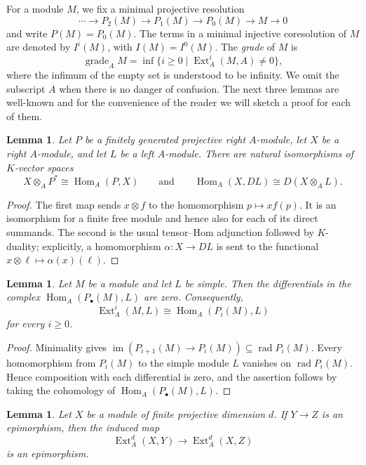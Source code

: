 \documentclass[a4paper]{amsart}
\newtheorem{lemma}[theorem]{Lemma}
\theoremstyle{definition}
\theoremstyle{remark}
\numberwithin{equation}{section}
\newcommand{\Ext}{\operatorname{Ext}}
\newcommand{\gr}{\operatorname{grade}}
\newcommand{\Hom}{\operatorname{Hom}}
\newcommand{\rad}{\operatorname{\mathrm{rad}}}
\begin{document}
For a module $M$, we fix a minimal projective resolution
\[
 \cdots\longrightarrow P_2(M)\longrightarrow P_1(M)
 \longrightarrow P_0(M)\longrightarrow M\longrightarrow 0
\]
and write $P(M)=P_0(M)$. The terms in a minimal injective coresolution of $M$ are denoted by $I^i(M)$, with $I(M)=I^0(M)$. The \emph{grade} of $M$ is
\[
 \gr_A M=\inf\{i\geq 0\mid \Ext_A^i(M,A)\neq 0\},
\]
where the infimum of the empty set is understood to be infinity. We omit the subscript $A$ when there is no danger of confusion.
The next three lemmas are well-known and for the convenience of the reader we will sketch a proof for each of them.

\begin{lemma}\label{lem:duality-evaluation}
Let $P$ be a finitely generated projective right $A$-module, let $X$ be a right $A$-module, and let $L$ be a left $A$-module. There are natural isomorphisms of $K$-vector spaces
\[
 X\otimes_A P^*\cong\Hom_A(P,X)
 \qquad\text{and}\qquad
 \Hom_A(X,DL)\cong D(X\otimes_A L).
\]
\end{lemma}

\begin{proof}
The first map sends $x\otimes f$ to the homomorphism $p\mapsto xf(p)$. It is an isomorphism for a finite free module and hence also for each of its direct summands. The second is the usual tensor--Hom adjunction followed by $K$-duality; explicitly, a homomorphism $\alpha\colon X\to DL$ is sent to the functional $x\otimes \ell\mapsto\alpha(x)(\ell)$.
\end{proof}

\begin{lemma}\label{lem:minimal-ext-simple}
Let $M$ be a module and let $L$ be simple. Then the differentials in the complex $\Hom_A(P_\bullet(M),L)$ are zero. Consequently,
\[
 \Ext_A^i(M,L)\cong\Hom_A(P_i(M),L)
\]
for every $i\geq 0$.
\end{lemma}

\begin{proof}
Minimality gives $\operatorname{im}(P_{i+1}(M)\to P_i(M))\subseteq\rad P_i(M)$. Every homomorphism from $P_i(M)$ to the simple module $L$ vanishes on $\rad P_i(M)$. Hence composition with each differential is zero, and the assertion follows by taking the cohomology of $\Hom_A(P_\bullet(M),L)$.
\end{proof}

\begin{lemma}\label{lem:top-ext-epimorphism}
Let $X$ be a module of finite projective dimension $d$. If $Y\to Z$ is an epimorphism, then the induced map
\[
 \Ext_A^d(X,Y)\longrightarrow\Ext_A^d(X,Z)
\]
is an epimorphism.
\end{lemma}
\end{document}
